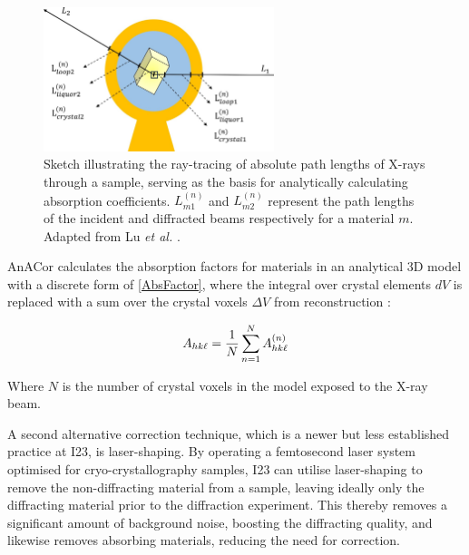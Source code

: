 \begin{figure}
    \centering
    \includegraphics[width = 0.6\textwidth]{images/absorption correction diagram.jpg}
    \caption{Sketch illustrating the ray-tracing of absolute path lengths of X-rays through a sample, serving as the basis for analytically calculating absorption coefficients. $L_{m1}^{(n)}$ and $L_{m2}^{(n)}$ represent the path lengths of the incident and diffracted beams respectively for a material $m$. Adapted from Lu \textit{et al.} \cite{Lu2024}.
    }
    \label{fig:analytical correction model}
\end{figure}

AnACor calculates the absorption factors for materials in an analytical 3D model with a discrete form of \cref{AbsFactor}, where the integral over crystal elements $dV$ is replaced with a sum over the crystal voxels $\Delta V$ from  reconstruction \cite{Lu2024}: %

\begin{equation}
    A_{hk\ell} = \frac{1}{N} \sum_{n=1}^N A_{hk\ell}^{(n)}
\end{equation}

Where $N$ is the number of crystal voxels in the model exposed to the X-ray beam.

A second alternative correction technique, which is a newer but less established practice at I23, is laser-shaping. By operating a femtosecond laser system optimised for cryo-crystallography samples, I23 can utilise laser-shaping to remove the non-diffracting material from a sample, leaving ideally only the diffracting material prior to the diffraction experiment. This thereby removes a significant amount of background noise, boosting the diffracting quality, and likewise removes absorbing materials, reducing the need for correction.

